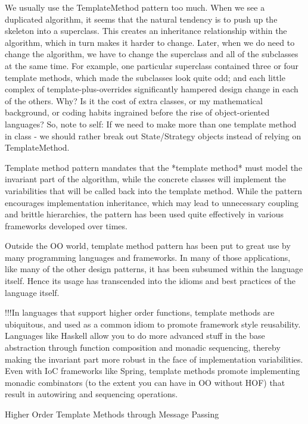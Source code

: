     We usually use the TemplateMethod pattern too much.
    When we see a duplicated algorithm, it seems that the natural tendency is to push up the skeleton into a superclass.
    This creates an inheritance relationship within the algorithm, which in turn makes it harder to change.
    Later, when we do need to change the algorithm, we have to change the superclass and all of the subclasses at the same time.
    For example, one particular superclass contained three or four template methods, which made the subclasses look quite odd;
    and each little complex of template-plus-overrides significantly hampered design change in each of the others.
    Why? Is it the cost of extra classes, or my mathematical background, or coding habits ingrained before the rise of object-oriented languages?
    So, note to self: If we need to make more than one template method in class - we should rather break out State/Strategy objects instead of relying on TemplateMethod.~\cite{res23}
    
    Template method pattern mandates that the *template method* must model the invariant part of the algorithm, while the concrete classes will implement the variabilities that will be called back into the template method. While the pattern encourages implementation inheritance, which may lead to unnecessary coupling and brittle hierarchies, the pattern has been used quite effectively in various frameworks developed over times.

    Outside the OO world, template method pattern has been put to great use by many programming languages and frameworks. In many of those applications, like many of the other design patterns, it has been subsumed within the language itself. Hence its usage has transcended into the idioms and best practices of the language itself.~\cite{res24}

    !!!In languages that support higher order functions, template methods are ubiquitous, and used as a common idiom to promote framework style reusability. Languages like Haskell allow you to do more advanced stuff in the base abstraction through function composition and monadic sequencing, thereby making the invariant part more robust in the face of implementation variabilities. Even with IoC frameworks like Spring, template methods promote implementing monadic combinators (to the extent you can have in OO without HOF) that result in autowiring and sequencing operations.

    Higher Order Template Methods through Message Passing


